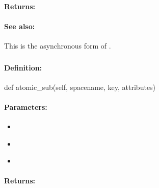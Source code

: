 \paragraph{Returns:}


\paragraph{See also:}  This is the asynchronous form of .

\pagebreak
\subsubsection{}
\label{api:python:atomic_sub}


\paragraph{Definition:}
\begin{pythoncode}
def atomic_sub(self, spacename, key, attributes)
\end{pythoncode}

\paragraph{Parameters:}
\begin{itemize}[noitemsep]
\item {}\\

\item {}\\

\item {}\\

\end{itemize}

\paragraph{Returns:}


\pagebreak
\subsubsection{}
\label{api:python:async_atomic_sub}


